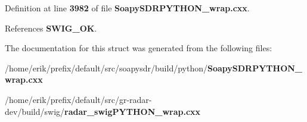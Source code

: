 Definition at line {\bf 3982} of file {\bf Soapy\+S\+D\+R\+P\+Y\+T\+H\+O\+N\+\_\+wrap.\+cxx}.



References {\bf S\+W\+I\+G\+\_\+\+OK}.



The documentation for this struct was generated from the following files\+:\begin{DoxyCompactItemize}
\item 
/home/erik/prefix/default/src/soapysdr/build/python/{\bf Soapy\+S\+D\+R\+P\+Y\+T\+H\+O\+N\+\_\+wrap.\+cxx}\item 
/home/erik/prefix/default/src/gr-\/radar-\/dev/build/swig/{\bf radar\+\_\+swig\+P\+Y\+T\+H\+O\+N\+\_\+wrap.\+cxx}\end{DoxyCompactItemize}
